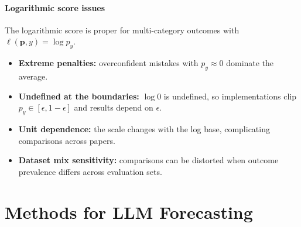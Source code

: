 \documentclass[12pt,a4paper]{article}
\begin{document}

\paragraph{Logarithmic score issues}
The logarithmic score is proper for multi-category outcomes with $\ell(\mathbf{p},y)=\log{p_y}$.
\begin{itemize}
\item \textbf{Extreme penalties:} overconfident mistakes with $p_y\!\approx\!0$ dominate the average.
\item \textbf{Undefined at the boundaries:} $\log 0$ is undefined, so implementations clip $p_y\in[\epsilon,1-\epsilon]$ and results depend on $\epsilon$.
\item \textbf{Unit dependence:} the scale changes with the log base, complicating comparisons across papers.
\item \textbf{Dataset mix sensitivity:} comparisons can be distorted when outcome prevalence differs across evaluation sets.
\end{itemize}


\clearpage
\section{Methods for LLM Forecasting}
\end{document}
